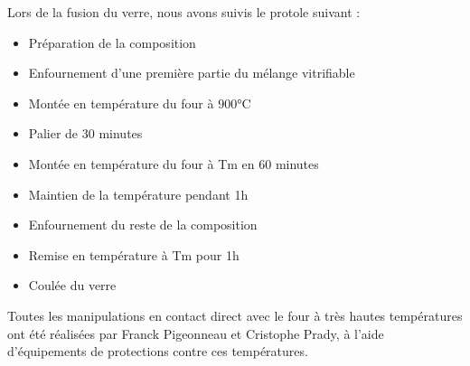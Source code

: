 \documentclass{article}
\begin{document}
Lors de la fusion du verre, nous avons suivis le protole suivant :

\begin{itemize}
    \item Préparation de la composition
    \item Enfournement d'une première partie du mélange vitrifiable
    \item Montée en température du four à 900°C
    \item Palier de 30 minutes
    \item Montée en température du four à Tm en 60 minutes
    \item Maintien de la température pendant 1h
    \item Enfournement du reste de la composition
    \item Remise en température à Tm pour 1h
    \item Coulée du verre
\end{itemize}

Toutes les manipulations en contact direct avec le four à très hautes températures ont été réalisées par Franck Pigeonneau et Cristophe Prady, à l'aide d'équipements de protections contre ces températures.
\end{document}
